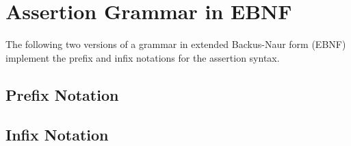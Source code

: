 \appendix
\chapter{Assertion Grammar in EBNF}\label{apx:grammar}
The following two versions of a grammar in extended Backus-Naur form (EBNF) implement the prefix and infix notations for the assertion syntax. 

\section{Prefix Notation}


\section{Infix Notation}


